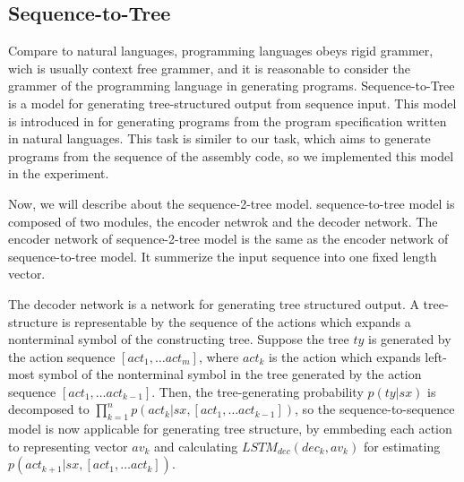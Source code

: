 \documentclass[senior,final,11pt]{iscs-thesis}
\begin{document}






\subsection{Sequence-to-Tree}
Compare to natural languages, programming languages obeys rigid grammer, wich is usually context free grammer,  
and it is reasonable to consider the grammer of the programming language in generating programs.
Sequence-to-Tree is a model for generating tree-structured output from sequence input. This model is introduced in \cite{Seq2Tree} for generating programs from the program specification written in natural languages. 
This task is similer to our task, which aims to generate programs from the sequence of the assembly code, so we implemented this model in the experiment.

Now, we will describe about the sequence-2-tree model.
sequence-to-tree model is composed of two modules, the encoder netwrok and the decoder network.
The encoder network of sequence-2-tree model is the same as the encoder network of sequence-to-tree model. It summerize the input sequence into one fixed length vector.

The decoder network is a network for generating tree structured output. 
A tree-structure is representable by the sequence of the actions which expands a nonterminal symbol of the constructing tree.
Suppose the tree $ty$ is generated by the action sequence $ [act_1, \dots act_m] $, 
where $ act_k $ is the action which expands left-most symbol of the nonterminal symbol in the tree generated by the action sequence $ [act_1, \dots act_{k-1}] $. 
Then, the tree-generating probability $ p(ty|sx) $ is decomposed to $ \prod_{k=1}^n p(act_k|sx,[act_1, \dots act_{k-1}]) $, 
so the sequence-to-sequence model is now applicable for generating tree structure, by emmbeding each action to representing vector $av_k$ and 
calculating $ LSTM_{dec}(dec_{k},av_{k}) $ for estimating $p(act_{k+1}|sx,[act_1, \dots act_{k}]) $.  
\end{document}
